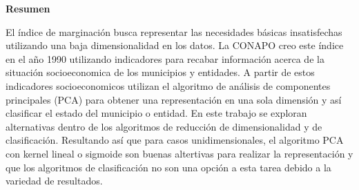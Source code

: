 \begin{center}
    \begin{minipage}{0.8\linewidth}
        \begin{center}
            \changefontsizes{12pt}
            \textbf{Resumen}
        \end{center}
        El índice de marginación busca representar las necesidades básicas insatisfechas utilizando una baja dimensionalidad en los datos. La CONAPO creo este índice en el año 1990 utilizando indicadores para recabar información acerca de la situación socioeconomica de los municipios y entidades. A partir de estos indicadores socioeconomicos utilizan el algoritmo de análisis de componentes principales (PCA) para obtener una representación en una sola dimensión y así clasificar el estado del municipio o entidad. En este trabajo se exploran alternativas dentro de los algoritmos de reducción de dimensionalidad y de clasificación. Resultando así que para casos unidimensionales, el algoritmo PCA con kernel lineal o sigmoide son buenas altertivas para realizar la representación y que los algoritmos de clasificación no son una opción a esta tarea debido a la variedad de resultados.
    \end{minipage}
\end{center}